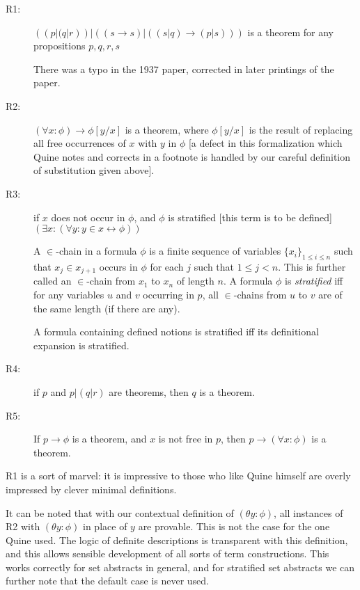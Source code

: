 \documentclass[12pt]{article}
\begin{document}
\begin{description}

\item[R1:] $((p|(q|r))|((s \rightarrow s)|((s|q) \rightarrow (p|s)))$ is a theorem for any propositions $p,q,r,s$

There was a typo in the 1937 paper, corrected in later printings of the paper.

\item[R2:]  $(\forall x:\phi) \rightarrow \phi[y/x]$ is a theorem, where $\phi[y/x]$ is the result of replacing all free occurrences of $x$ with $y$ in $\phi$ [a defect in this formalization which Quine notes and corrects in a footnote is handled by our careful definition of substitution given above].

\item[R3:]  if $x$ does not occur in $\phi$, and $\phi$ is stratified [this term is to be defined] $(\exists x:(\forall y:y \in x  \leftrightarrow \phi))$

A $\in$-chain in a formula $\phi$ is a finite sequence of variables $\{x_i\}_{1\leq i\leq n}$ such that $x_j \in x_{j+1}$ occurs in
$\phi$ for each $j$ such that $1 \leq j<n$.  This is further called an $\in$-chain from $x_1$ to $x_n$ of length $n$.
A formula $\phi$ is {\em stratified\/} iff for any variables $u$ and $v$ occurring in $p$, all $\in$-chains from $u$ to $v$ are of the same length (if there are any).

A formula containing defined notions is stratified iff its definitional expansion is stratified.

\item[R4:]  if $p$ and $p|(q|r)$ are theorems, then $q$ is a theorem.

\item[R5:]  If $p \rightarrow \phi$ is a theorem, and $x$ is not free in $p$, then $p \rightarrow (\forall x:\phi)$ is a theorem.


\end{description}

R1 is a sort of marvel:  it is impressive to those who like Quine himself are overly impressed by clever minimal definitions.

It can be noted that with our contextual definition of $(\theta y:\phi)$, all instances of R2 with $(\theta y:\phi)$ in place of $y$ are provable.  This is not the case for the one Quine used.  The logic of definite descriptions is transparent with this definition, and this allows sensible development of all sorts of term constructions.  This works correctly for set abstracts in general, and for  stratified set abstracts we can further note that the default case is never used.
\end{document}
